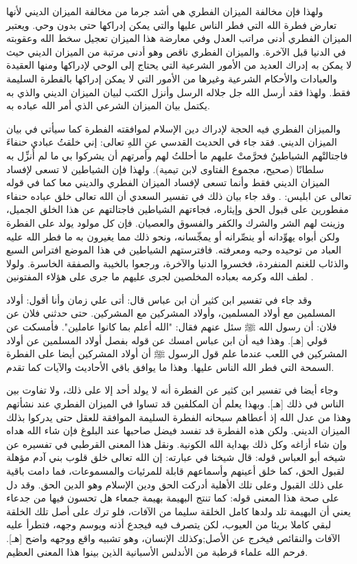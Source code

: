 ولهذا فإن مخالفة الميزان الفطري هي أشد جرما من مخالفة الميزان الديني لأنها تعارض فطرة الله التي فطر الناس عليها والتي يمكن إدراكها حتى بدون وحي. ويعتبر الميزان الفطري أدنى مراتب العدل وفي معارضة هذا الميزان تعجيل سخط الله وعقوبته في الدنيا قبل الآخرة. والميزان الفطري ناقص وهو أدنى مرتبة من الميزان الديني حيث لا يمكن به إدراك العديد من الأمور الشرعية التي يحتاج إلى الوحي لإدراكها ومنها العقيدة والعبادات والأحكام الشرعية وغيرها من الأمور التي لا يمكن إدراكها بالفطرة السليمة فقط. ولهذا فقد أرسل الله جل جلاله الرسل وأنزل الكتب لبيان الميزان الديني والذي به يكتمل بيان الميزان الشرعي الذي أمر الله عباده به.

والميزان الفطري فيه الحجة لإدراك دين الإسلام لموافقته الفطرة كما سيأتي في بيان الميزان الديني. فقد جاء في الحديث القدسي عنِ اللهِ تعالى: إني خلقتُ عبادي حنفاءَ فاجتالتْهم الشياطينُ فحرَّمتْ عليهم ما أحللتُ لهم وأمرتهم أن يشركوا بي ما لم أُنزِّل به سلطانًا {\footnotesize (صحيح، مجموع الفتاوى لابن تيمية)}.
ولهذا فإن الشياطين لا تسعى لإفساد الميزان الديني فقط وأنما تسعى لإفساد الميزان الفطري والديني معا كما في قوله تعالى عن ابليس: 
\quranayah*[4][119]{\footnotesize \surahname*[4]}. وقد جاء بيان ذلك في تفسير السعدي أن الله تعالى خلق عباده حنفاء مفطورين على قبول الحق وإيثاره، فجاءتهم الشياطين فاجتالتهم عن هذا الخلق الجميل، وزينت لهم الشر والشرك والكفر والفسوق والعصيان. فإن كل مولود يولد على الفطرة ولكن أبواه يهوِّدانه أو ينصِّرانه أو يمجِّسانه، ونحو ذلك مما يغيرون به ما فطر الله عليه العباد من توحيده وحبه ومعرفته. فافترستهم الشياطين في هذا الموضع افتراس السبع والذئاب للغنم المنفردة، فخسروا الدنيا والآخرة، ورجعوا بالخيبة والصفقة الخاسرة. ولولا لطف الله وكرمه بعباده المخلصين لجرى عليهم ما جرى على هؤلاء المفتونين \cite{tafsir_Saadi}.

وقد جاء في تفسير ابن كثير أن ابن عباس قال: 
أتى علي زمان وأنا أقول: أولاد المسلمين مع أولاد المسلمين، وأولاد المشركين مع المشركين. حتى حدثني فلان عن فلان: أن رسول الله ﷺ سئل عنهم فقال: "الله أعلم بما كانوا عاملين". فأمسكت عن قولي [هـ]. وهذا فيه أن ابن عباس امسك عن قوله بفصل أولاد المسلمين عن أولاد المشركين في اللعب عندما علم قول الرسول ﷺ أن أولاد المشركين أيضا على الفطرة السمحة التي فطر الله الناس عليها. وهذا ما يوافق باقي الأحاديث والآيات كما تقدم. 

وجاء أيضا في تفسير ابن كثير عن الفطرة أنه لا يولد أحد إلا على ذلك، ولا تفاوت بين الناس في ذلك [هـ]. وبهذا يعلم أن المكلفين قد تساوا في الميزان الفطري عند نشأتهم وهذا من عدل الله إذ أعطاهم سبحانه الفطرة السليمة الموافقة للعقل حتى يدركوا بذلك الميزان الديني. ولكن هذه الفطرة قد تفسد فيضل صاحبها عند البلوغ فإن شاء الله هداه وإن شاء أزاغه وكل ذلك بهداية الله الكونية. ونقل هذا المعنى القرطبي في تفسيره عن شيخه أبو العباس قوله: قال شيخنا في عبارته: إن الله تعالى خلق قلوب بني آدم مؤهلة لقبول الحق، كما خلق أعينهم وأسماعهم قابلة للمرئيات والمسموعات، فما دامت باقية على ذلك القبول وعلى تلك الأهلية أدركت الحق ودين الإسلام وهو الدين الحق. وقد دل على صحة هذا المعنى قوله: كما تنتج البهيمة بهيمة جمعاء هل تحسون فيها من جدعاء يعني أن البهيمة تلد ولدها كامل الخلقة سليما من الآفات، فلو ترك على أصل تلك الخلقة لبقي كاملا بريئا من العيوب، لكن يتصرف فيه فيجدع أذنه ويوسم وجهه، فتطرأ عليه الآفات والنقائص فيخرج عن الأصل;وكذلك الإنسان، وهو تشبيه واقع ووجهه واضح [هـ]. فرحم الله علماء قرطبة من الأندلس الأسبانية الذين بينوا هذا المعنى العظيم.

